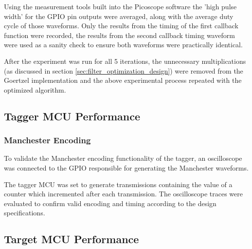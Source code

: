 Using the measurement tools built into the Picoscope software the 'high pulse width' for the GPIO pin outputs were averaged, along with the average duty cycle of those waveforms. Only the results from the timing of the first callback function were recorded, the results from the second callback timing waveform were used as a sanity check to ensure both waveforms were practically identical.


After the experiment was run for all 5 iterations, the unnecessary multiplications (as discussed in section \ref{sec:filter_optimization_design}) were removed from the Goertzel implementation and the above experimental process repeated with the optimized algorithm.







\subsection{Tagger MCU Performance}

\subsubsection{Manchester Encoding}
To validate the Manchester encoding functionality of the tagger, an oscilloscope was connected to the GPIO responsible for generating the Manchester waveforms.

The tagger MCU was set to generate transmissions containing the value of a counter which incremented after each transmission. The oscilloscope traces were evaluated to confirm valid encoding and timing according to the design specifications.




\subsection{Target MCU Performance}

